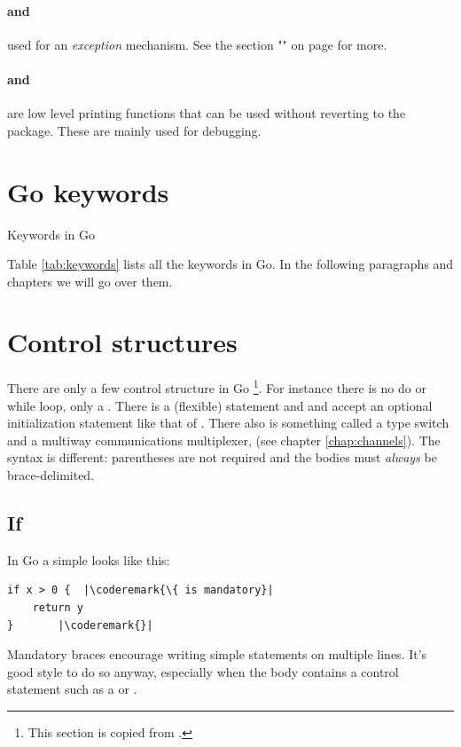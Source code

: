 \paragraph{ and } used for an 
\emph{exception} mechanism. See the section "" on 
page \pageref{sec:panic} for more.

\paragraph{ and } are low level printing
functions that can be used without reverting to the
package. These are mainly used for debugging.

\section{Go keywords}
\begin{table}[H]
\begin{center}
\caption{Keywords in Go}
\label{tab:keywords}

\end{center}
\end{table}
Table \ref{tab:keywords} lists all the keywords in Go. 
In the following paragraphs and chapters we will go over them.

\section{Control structures}
There are only a few control structure in 
Go \footnote{This section is copied from \cite{effective_go}.}.
For instance there is no do or while loop, only a 
. There is a (flexible)  statement and  and
 accept an
optional initialization statement like that of . There also is
something called a type switch and a multiway communications
multiplexer,  (see chapter \ref{chap:channels}). The syntax is different: parentheses
are not required and the bodies must \emph{always} be brace-delimited.

\subsection{If}
In Go a simple  looks like this:
\begin{lstlisting}
if x > 0 {	|\coderemark{\{ is mandatory}|
    return y
}		|\coderemark{}|
\end{lstlisting}
Mandatory braces encourage writing simple  statements on multiple
lines. It's good style to do so anyway, especially when the body
contains a control statement such as a  or .

